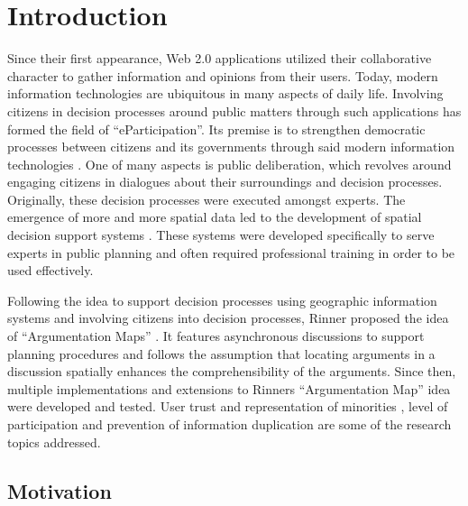 \section{Introduction}
Since their first appearance, Web 2.0 applications utilized their collaborative character to gather information and opinions from their users. Today, modern information technologies are ubiquitous in many aspects of daily life. Involving citizens in decision processes around public matters through such applications has formed the field of ``eParticipation''. Its premise is to strengthen democratic processes between citizens and its governments through said modern information technologies \cite{Saebo_eParticipation, Medaglia2012_eParticipation}. One of many aspects is public deliberation, which revolves around engaging citizens in dialogues about their surroundings and decision processes. Originally, these decision processes were executed amongst experts. The emergence of more and more spatial data led to the development of spatial decision support systems \cite{densham_sdss}. These systems were developed specifically to serve experts in public planning and often required professional training in order to be used effectively.

Following the idea to support decision processes using geographic information systems and involving citizens into decision processes, Rinner proposed the idea of ``Argumentation Maps'' \cite{Rinner_ArgumentationMaps}. It features asynchronous discussions to support planning procedures and follows the assumption that locating arguments in a discussion spatially enhances the comprehensibility of the arguments. Since then, multiple implementations and extensions to Rinners ``Argumentation Map'' idea were developed and tested. User trust and representation of minorities \cite{Carver2001_PPGIS_Cyberdemocracy}, level of participation \cite{Steinmann2005_Combination_Ladder_GIS} and prevention of information duplication \cite{Hopfer2007_Communication} are some of the research topics addressed.


\subsection{Motivation}